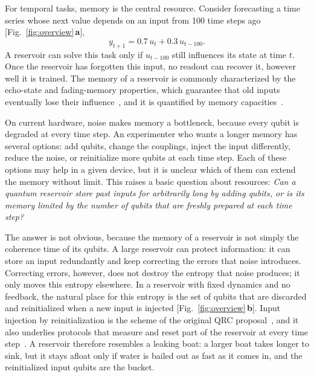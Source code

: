 \documentclass[aps,pra,reprint,superscriptaddress,floatfix]{revtex4-2}
\theoremstyle{plain}
\newcommand{\pnl}[1]{\textsf{\textbf{#1}}}
\begin{document}
For temporal tasks, memory is the central resource. Consider forecasting a time series whose next value depends on an input from 100 time steps ago [Fig.~\ref{fig:overview}\,\pnl{a}],
\begin{equation}
y_{t+1}=0.7\,u_t+0.3\,u_{t-100}.
\label{eq:task}
\end{equation}
A reservoir can solve this task only if $u_{t-100}$ still influences its state at time $t$. Once the reservoir has forgotten this input, no readout can recover it, however well it is trained. The memory of a reservoir is commonly characterized by the echo-state and fading-memory properties, which guarantee that old inputs eventually lose their influence~\cite{Jaeger2001,Boyd1985,MartinezPena2023}, and it is quantified by memory capacities~\cite{Jaeger2002}.

On current hardware, noise makes memory a bottleneck, because every qubit is degraded at every time step. An experimenter who wants a longer memory has several options: add qubits, change the couplings, inject the input differently, reduce the noise, or reinitialize more qubits at each time step. Each of these options may help in a given device, but it is unclear which of them can extend the memory without limit. This raises a basic question about resources: \emph{Can a quantum reservoir store past inputs for arbitrarily long by adding qubits, or is its memory limited by the number of qubits that are freshly prepared at each time step?}

The answer is not obvious, because the memory of a reservoir is not simply the coherence time of its qubits. A large reservoir can protect information: it can store an input redundantly and keep correcting the errors that noise introduces. Correcting errors, however, does not destroy the entropy that noise produces; it only moves this entropy elsewhere. In a reservoir with fixed dynamics and no feedback, the natural place for this entropy is the set of qubits that are discarded and reinitialized when a new input is injected [Fig.~\ref{fig:overview}\,\pnl{b}]. Input injection by reinitialization is the scheme of the original QRC proposal~\cite{Fujii2017}, and it also underlies protocols that measure and reset part of the reservoir at every time step~\cite{Yasuda2023,Hu2024}. A reservoir therefore resembles a leaking boat: a larger boat takes longer to sink, but it stays afloat only if water is bailed out as fast as it comes in, and the reinitialized input qubits are the bucket.
\end{document}
